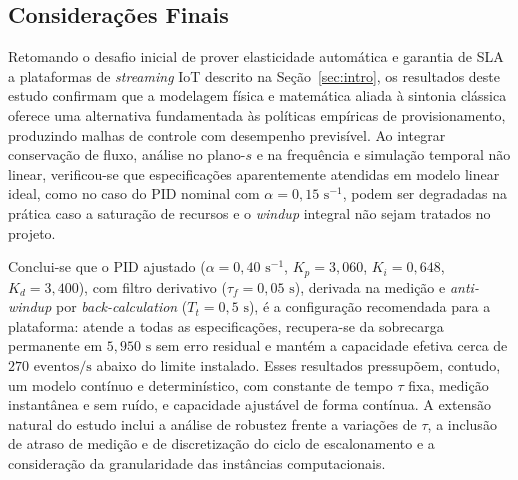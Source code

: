 \subsection{Considerações Finais}\label{sec:consideracoes_finais}
Retomando o desafio inicial de prover elasticidade automática e garantia de SLA a plataformas de \textit{streaming} IoT descrito na Seção~\ref{sec:intro}, os resultados deste estudo confirmam que a modelagem física e matemática aliada à sintonia clássica oferece uma alternativa fundamentada às políticas empíricas de provisionamento, produzindo malhas de controle com desempenho previsível. Ao integrar conservação de fluxo, análise no plano-$s$ e na frequência e simulação temporal não linear, verificou-se que especificações aparentemente atendidas em modelo linear ideal, como no caso do PID nominal com $\alpha = 0{,}15\text{ s}^{-1}$, podem ser degradadas na prática caso a saturação de recursos e o \textit{windup} integral não sejam tratados no projeto.

Conclui-se que o PID ajustado ($\alpha = 0{,}40\text{ s}^{-1}$, $K_p=3{,}060$, $K_i=0{,}648$, $K_d=3{,}400$), com filtro derivativo ($\tau_f = 0{,}05\text{ s}$), derivada na medição e \textit{anti-windup} por \textit{back-calculation} ($T_t = 0{,}5\text{ s}$), é a configuração recomendada para a plataforma: atende a todas as especificações, recupera-se da sobrecarga permanente em $5{,}950\text{ s}$ sem erro residual e mantém a capacidade efetiva cerca de $270\text{ eventos/s}$ abaixo do limite instalado. Esses resultados pressupõem, contudo, um modelo contínuo e determinístico, com constante de tempo $\tau$ fixa, medição instantânea e sem ruído, e capacidade ajustável de forma contínua. A extensão natural do estudo inclui a análise de robustez frente a variações de $\tau$, a inclusão de atraso de medição e de discretização do ciclo de escalonamento e a consideração da granularidade das instâncias computacionais.

